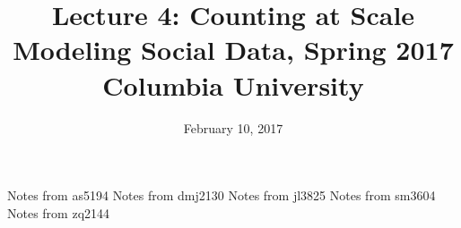 \documentclass{article}
\title{
Lecture 4: Counting at Scale \\  %
Modeling Social Data, Spring 2017 \\   %
Columbia University                    %
}
\date{February 10, 2017}                %
\makeatletter
\let\org@subfile
\renewcommand*{}[1]{%
  \filename@parse{#1}%
  \expandafter
  \graphicspath\expandafter{\expandafter{\filename@area}}%
  \org@subfile{#1}%
}
\makeatother
\begin{document}
\maketitle


\pagebreak \newpage \noindent\Huge{Notes from as5194} \normalsize \setcounter{section}{0} 
\pagebreak \newpage \noindent\Huge{Notes from dmj2130} \normalsize \setcounter{section}{0} 
\pagebreak \newpage \noindent\Huge{Notes from jl3825} \normalsize \setcounter{section}{0} 
\pagebreak \newpage \noindent\Huge{Notes from sm3604} \normalsize \setcounter{section}{0} 
\pagebreak \newpage \noindent\Huge{Notes from zq2144} \normalsize \setcounter{section}{0} 
\end{document}
